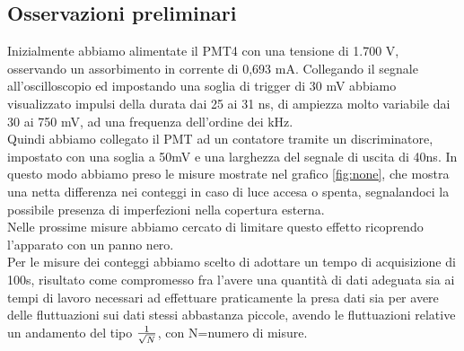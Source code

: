 \documentclass[a4paper,10pt]{article}
\begin{document}
\subsection{Osservazioni preliminari}
Inizialmente abbiamo alimentate il PMT4 con una tensione di 1.700 V, osservando un assorbimento in corrente di 0,693 mA. Collegando il segnale all'oscilloscopio ed impostando una soglia di trigger di 30 mV abbiamo visualizzato impulsi della durata dai 25 ai 31 ns, di ampiezza molto variabile dai 30 ai 750 mV, ad una frequenza dell'ordine dei kHz.
\\
Quindi abbiamo collegato il PMT ad un contatore tramite un discriminatore, impostato con una soglia a 50mV e una larghezza del segnale di uscita di 40ns. In questo modo abbiamo preso le misure mostrate nel grafico \ref{fig:none}, che mostra una netta differenza nei conteggi in caso di luce accesa o spenta, segnalandoci la possibile presenza di imperfezioni nella copertura esterna.
\\
Nelle prossime misure abbiamo cercato di limitare questo effetto ricoprendo l'apparato con un panno nero.
\\
Per le misure dei conteggi abbiamo scelto di adottare un tempo di acquisizione di 100s, risultato come compromesso fra l'avere una quantità di dati adeguata sia ai tempi di lavoro necessari ad effettuare praticamente la presa dati sia per avere delle fluttuazioni sui dati stessi abbastanza piccole, avendo le fluttuazioni relative un andamento del tipo $1\over{\sqrt{N}}$, con N=numero di misure.
\end{document}
